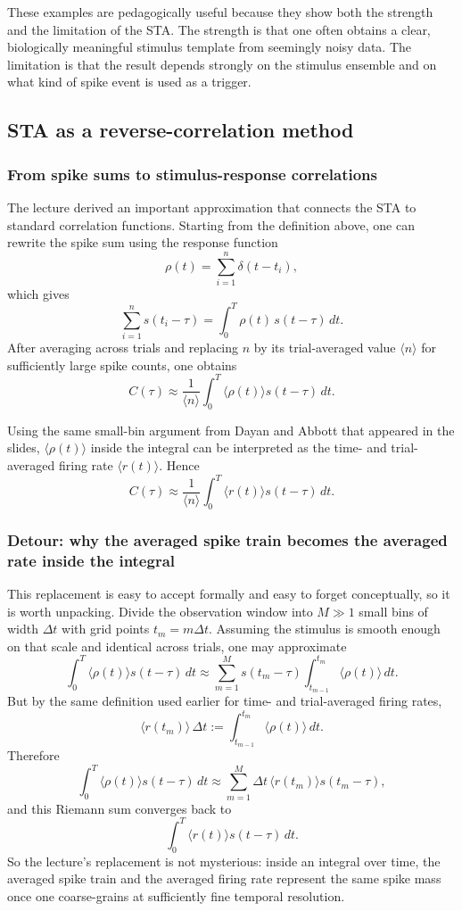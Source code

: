 \documentclass[11pt]{article}
\begin{document}
These examples are pedagogically useful because they show both the strength and the limitation of the STA. The strength is that one often obtains a clear, biologically meaningful stimulus template from seemingly noisy data. The limitation is that the result depends strongly on the stimulus ensemble and on what kind of spike event is used as a trigger.

\subsection{STA as a reverse-correlation method}

\subsubsection{From spike sums to stimulus-response correlations}

The lecture derived an important approximation that connects the STA to standard correlation functions. Starting from the definition above, one can rewrite the spike sum using the response function
\[
\rho(t)=\sum_{i=1}^{n}\delta(t-t_i),
\]
which gives
\[
\sum_{i=1}^{n} s(t_i-\tau) = \int_0^T \rho(t)\,s(t-\tau)\,dt.
\]
After averaging across trials and replacing $n$ by its trial-averaged value $\langle n \rangle$ for sufficiently large spike counts, one obtains
\[
C(\tau) \approx \frac{1}{\langle n \rangle}\int_0^T \langle \rho(t)\rangle s(t-\tau)\,dt.
\]

Using the same small-bin argument from Dayan and Abbott that appeared in the slides, $\langle \rho(t)\rangle$ inside the integral can be interpreted as the time- and trial-averaged firing rate $\langle r(t)\rangle$. Hence
\[
C(\tau) \approx \frac{1}{\langle n \rangle}\int_0^T \langle r(t)\rangle s(t-\tau)\,dt.
\]

\subsubsection{Detour: why the averaged spike train becomes the averaged rate inside the integral}

This replacement is easy to accept formally and easy to forget conceptually, so it is worth unpacking. Divide the observation window into $M\gg 1$ small bins of width $\Delta t$ with grid points $t_m=m\Delta t$. Assuming the stimulus is smooth enough on that scale and identical across trials, one may approximate
\[
\int_0^T \langle \rho(t)\rangle s(t-\tau)\,dt
\approx
\sum_{m=1}^{M} s(t_m-\tau)
\int_{t_{m-1}}^{t_m} \langle \rho(t)\rangle\,dt.
\]
But by the same definition used earlier for time- and trial-averaged firing rates,
\[
\langle r(t_m)\rangle\,\Delta t
:=
\int_{t_{m-1}}^{t_m} \langle \rho(t)\rangle\,dt.
\]
Therefore
\[
\int_0^T \langle \rho(t)\rangle s(t-\tau)\,dt
\approx
\sum_{m=1}^{M} \Delta t\,\langle r(t_m)\rangle s(t_m-\tau),
\]
and this Riemann sum converges back to
\[
\int_0^T \langle r(t)\rangle s(t-\tau)\,dt.
\]
So the lecture's replacement is not mysterious: inside an integral over time, the averaged spike train and the averaged firing rate represent the same spike mass once one coarse-grains at sufficiently fine temporal resolution.
\end{document}
